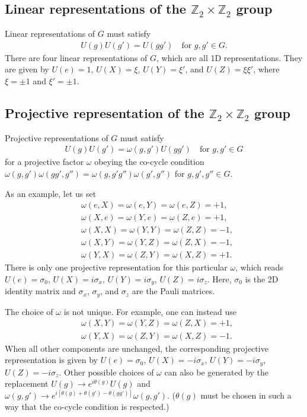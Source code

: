 \documentclass[3p,preprint]{elsarticle}
\begin{document}
\subsection{Linear representations of the $\mathbb{Z}_2\times\mathbb{Z}_2$ group}
Linear representations of $G$ must satisfy
\begin{eqnarray}
U(g)U(g')=U(gg')\quad \text{for } g,g'\in G.
\end{eqnarray}
There are four linear representations of $G$, which are all 1D representations. They are given by $U(e)=1$, $U(X)=\xi$, $U(Y)=\xi'$, and $U(Z)=\xi\xi'$, where $\xi=\pm1$ and $\xi'=\pm1$.


\subsection{Projective representation of the $\mathbb{Z}_2\times\mathbb{Z}_2$ group}
\label{appc3}
Projective representations of $G$ must satisfy
\begin{eqnarray}
U(g)U(g')=\omega(g,g')U(gg')\quad \text{for } g,g'\in G
\end{eqnarray}
for a projective factor $\omega$ obeying the co-cycle condition $\omega(g,g')\omega(gg',g'')=\omega(g,g'g'')\omega(g',g'')$ for $g,g',g''\in G$.

As an example, let us set
\begin{eqnarray}
&\omega(e,X)=\omega(e,Y)=\omega(e,Z)=+1,\\
&\omega(X,e)=\omega(Y,e)=\omega(Z,e)=+1,\\
&\omega(X,X)=\omega(Y,Y)=\omega(Z,Z)=-1,\\
&\omega(X,Y)=\omega(Y,Z)=\omega(Z,X)=-1,\\
&\omega(Y,X)=\omega(Z,Y)=\omega(X,Z)=+1.
\end{eqnarray}
There is only one projective representation for this particular $\omega$, which reads $U(e)=\sigma_0$, $U(X)=i\sigma_x$, $U(Y)=i\sigma_y$, $U(Z)=i\sigma_z$. Here, $\sigma_0$ is the 2D identity matrix and $\sigma_x$, $\sigma_y$, and $\sigma_z$ are the Pauli matrices.

The choice of $\omega$ is not unique. For example, one can instead use
\begin{eqnarray}
&\omega(X,Y)=\omega(Y,Z)=\omega(Z,X)=+1,\\
&\omega(Y,X)=\omega(Z,Y)=\omega(X,Z)=-1.
\end{eqnarray}
When all other components are unchanged, the corresponding projective representation is given by $U(e)=\sigma_0$, $U(X)=-i\sigma_x$, $U(Y)=-i\sigma_y$, $U(Z)=-i\sigma_z$. Other possible choices of $\omega$ can also be generated by the replacement $U(g)\rightarrow e^{i\theta(g)}U(g)$ and $\omega(g,g')\rightarrow e^{i[\theta(g)+\theta(g')-\theta(gg')]}\omega(g,g')$.  ($\theta(g)$ must be chosen in such a way that the co-cycle condition is respected.) 
\end{document}

